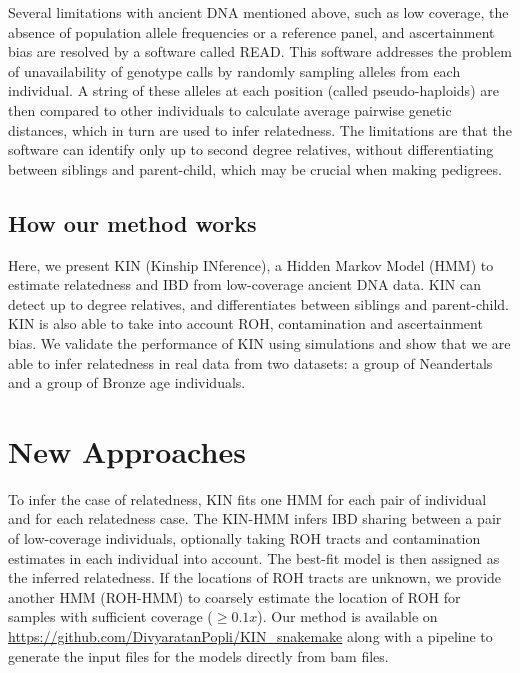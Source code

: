 \documentclass[12pt, letterpaper]{article}
\begin{document}
Several limitations with ancient DNA mentioned above, such as low coverage, the absence of population allele frequencies or a reference panel, and ascertainment bias are resolved by a software called READ. This software addresses the problem of unavailability of genotype calls by randomly sampling alleles from each individual. A string of these alleles at each position (called pseudo-haploids) are then compared to other individuals to calculate average pairwise genetic distances, which in turn are used to infer relatedness. The limitations are that the software can identify only up to second degree relatives, without differentiating between siblings and parent-child, which may be crucial when making pedigrees.

\subsection{How our method works}
Here, we present KIN (Kinship INference), a Hidden Markov Model (HMM) to estimate relatedness and IBD from low-coverage ancient DNA data. KIN can detect up to  degree relatives, and differentiates between siblings and parent-child. KIN is also able to take into account ROH, contamination and ascertainment bias. We validate the performance of KIN using simulations and show that we are able to infer relatedness in real data from two datasets: a group of Neandertals and a group of Bronze age individuals.


\section{New Approaches}\label{new_approaches}

To infer the case of relatedness, KIN fits one HMM for each pair of individual and for each relatedness case. The KIN-HMM infers IBD sharing between a pair of low-coverage individuals, optionally taking ROH tracts and contamination estimates in each individual into account. The best-fit model is then assigned as the inferred relatedness. If the locations of ROH tracts are unknown, we provide another HMM (ROH-HMM) to coarsely estimate the location of ROH for samples with sufficient coverage ($\geq 0.1x$). Our method is available on \url{https://github.com/DivyaratanPopli/KIN_snakemake} along with a  \cite{koster_snakemakescalable_2012} pipeline to generate the input files for the models directly from bam files. 
\end{document}
